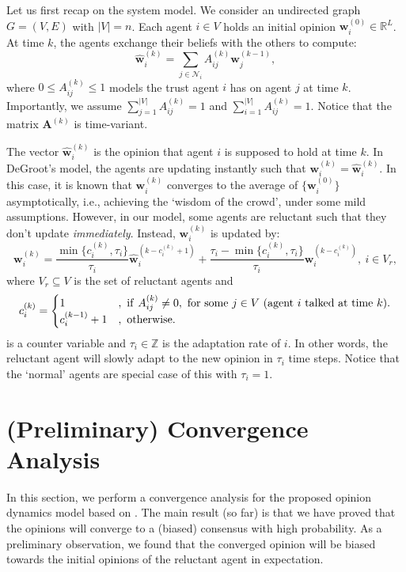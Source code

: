 \documentclass[letter]{article}
\theoremstyle{t}
\begin{document}
Let us first recap on the system model.
We consider an undirected graph $G = (V,E)$ with $|V| = n$. Each agent $i \in V$ holds an initial opinion ${\bm w}_i^{(0)} \in \mathbb{R}^L$. At time $k$, the agents exchange their beliefs with the others to compute:
\begin{equation}\label{eq:op}
\hat{\bm w}_i^{(k)} = \sum_{j \in \mathcal{N}_i} A_{ij}^{(k)} {\bm w}_j^{(k-1)},
\end{equation}
where $0 \leq A_{ij}^{(k)} \leq 1$ models the trust agent $i$ has on agent $j$ at time $k$. Importantly, we assume $\sum_{j=1}^{|V|} A_{ij}^{(k)} = 1$ and $\sum_{i=1}^{|V|} A_{ij}^{(k)} = 1$. Notice that the matrix ${\bm A}^{(k)}$ is time-variant. 

The vector $\hat{\bm w}_i^{(k)}$ is the opinion that agent $i$ is supposed to hold at time $k$. In DeGroot's model, the agents are updating instantly such that ${\bm w}_i^{(k)} = \hat{\bm w}_i^{(k)} $. In this case, it is known that ${\bm w}_i^{(k)}$ converges to the average of $\{{\bm w}_i^{(0)} \}$ asymptotically, i.e., achieving the `wisdom of the crowd',  under some mild assumptions. 
However, in our model, some agents are reluctant such that they don't update \emph{immediately}. Instead, ${\bm w}_i^{(k)}$ is updated by:
\begin{equation} \label{eq:adapt}
{\bm w}_i^{(k)} = \frac{\min\{ c_i^{(k)}, \tau_i\} }{\tau_i} \hat{\bm w}_i^{(k - c_i^{(k)} + 1)} + \frac{\tau_i - \min\{ c_i^{(k)}, \tau_i\} }{\tau_i} {\bm w}_i^{(k-c_i^{(k)})},~i \in V_r,
\end{equation}
where $V_r \subseteq V$ is the set of reluctant agents and 
\[
c_i^{(k)} = \begin{cases}
1 &,~{\rm if}~A_{ij}^{(k)} \neq 0,~\text{for some}~j \in V~\text{(agent $i$ talked at time $k$)}. \\
c_i^{(k-1)} + 1 &,~{\rm otherwise}.
\end{cases}
\]
is a counter variable and $\tau_i \in \mathbb{Z}$ is the adaptation rate of $i$. In other words, the reluctant agent will slowly adapt to the new opinion in $\tau_i$ time steps. Notice that the `normal' agents are special case of this with $\tau_i = 1$. 

\section{(Preliminary) Convergence Analysis} 
In this section, we perform a convergence analysis for the proposed opinion dynamics model based on \cite{}. The main result (so far) is that we have proved that the opinions will  converge to a (biased) consensus with high probability. As a preliminary observation, we found that the converged opinion will be biased towards the initial opinions of the reluctant agent in expectation. 
\end{document}
